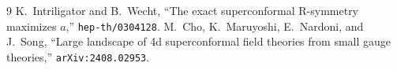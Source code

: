 \documentclass[12pt]{article}
\begin{document}
\begin{thebibliography}{9}
 K.~Intriligator and B.~Wecht, ``The exact superconformal R-symmetry maximizes $a$,'' \texttt{hep-th/0304128}.
 M.~Cho, K.~Maruyoshi, E.~Nardoni, and J.~Song, ``Large landscape of 4d superconformal field theories from small gauge theories,'' \texttt{arXiv:2408.02953}.
\end{thebibliography}
\end{document}
